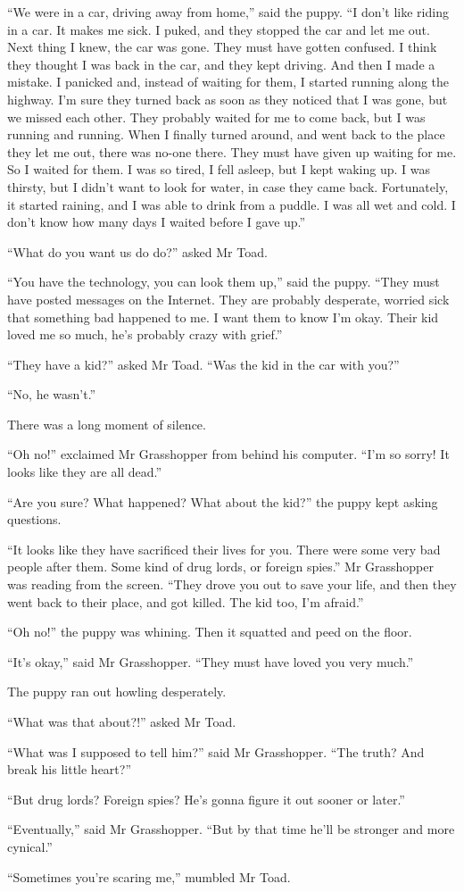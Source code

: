\documentclass{memoir}
\begin{document}
``We were in a car, driving away from home,'' said the puppy. ``I don't like riding in a car. It makes me sick. I puked, and they stopped the car and let me out. Next thing I knew, the car was gone. They must have gotten confused. I think they thought I was back in the car, and they kept driving. And then I made a mistake. I panicked and, instead of waiting for them, I started running along the highway. I'm sure they turned back as soon as they noticed that I was gone, but we missed each other. They probably waited for me to come back, but I was running and running. When I finally turned around, and went back to the place they let me out, there was no-one there. They must have given up waiting for me. So I waited for them. I was so tired, I fell asleep, but I kept waking up. I was thirsty, but I didn't want to look for water, in case they came back. Fortunately, it started raining, and I was able to drink from a puddle. I was all wet and cold. I don't know how many days I waited before I gave up.''

``What do you want us do do?'' asked Mr Toad.

``You have the technology, you can look them up,'' said the puppy. ``They must have posted messages on the Internet. They are probably desperate, worried sick that something bad happened to me. I want them to know I'm okay. Their kid loved me so much, he's probably crazy with grief.''

``They have a kid?'' asked Mr Toad. ``Was the kid in the car with you?''

``No, he wasn't.''

There was a long moment of silence. 

``Oh no!'' exclaimed Mr Grasshopper from behind his computer. ``I'm so sorry! It looks like they are all dead.''

``Are you sure? What happened? What about the kid?'' the puppy kept asking questions.

``It looks like they have sacrificed their lives for you. There were some very bad people after them. Some kind of drug lords, or foreign spies.'' Mr Grasshopper was reading from the screen. ``They drove you out to save your life, and then they went back to their place, and got killed. The kid too, I'm afraid.''

``Oh no!'' the puppy was whining. Then it squatted and peed on the floor. 

``It's okay,'' said Mr Grasshopper. ``They must have loved you very much.''

The puppy ran out howling desperately.

``What was that about?!'' asked Mr Toad.

``What was I supposed to tell him?'' said Mr Grasshopper. ``The truth? And break his little heart?''

``But drug lords? Foreign spies? He's gonna figure it out sooner or later.''

``Eventually,'' said Mr Grasshopper. ``But by that time he'll be stronger and more cynical.''

``Sometimes you're scaring me,'' mumbled Mr Toad.
\end{document}
